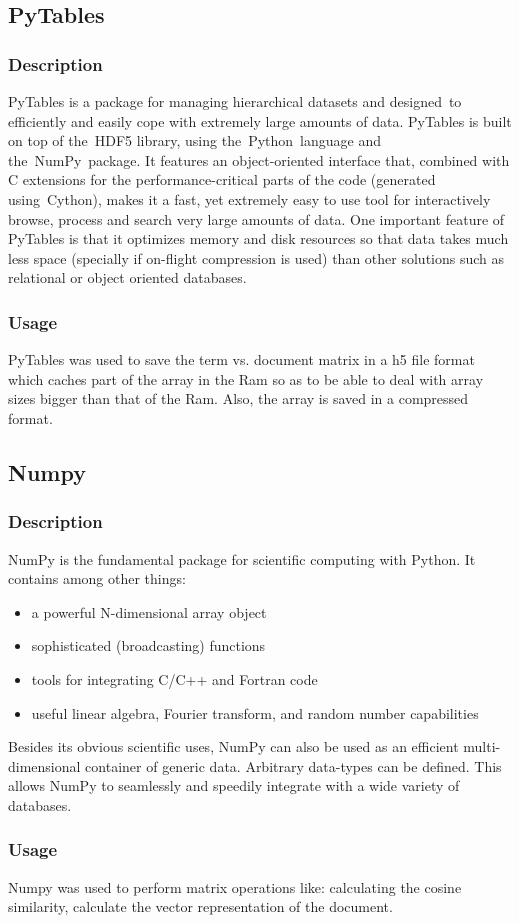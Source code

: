 \subsection{PyTables}
\subsubsection{Description}
PyTables is a package for managing hierarchical datasets and designed to efficiently and easily cope with extremely large amounts of data. 
PyTables is built on top of the HDF5 library, using the Python language and the NumPy package. It features an object-oriented interface that, combined with C extensions for the performance-critical parts of the code (generated using Cython), makes it a fast, yet extremely easy to use tool for interactively browse, process and search very large amounts of data. One important feature of PyTables is that it optimizes memory and disk resources so that data takes much less space (specially if on-flight compression is used) than other solutions such as relational or object oriented databases.
\subsubsection{Usage}
PyTables was used to save the term vs. document matrix in a h5 file format which caches part of the array in the Ram so as to be able to deal with array sizes bigger than that of the Ram. Also, the array is saved in a compressed format.
\subsection{Numpy}
\subsubsection{Description}
NumPy is the fundamental package for scientific computing with Python. It contains among other things:
\begin{itemize}
\item a powerful N-dimensional array object
\item sophisticated (broadcasting) functions
\item tools for integrating C/C++ and Fortran code
\item useful linear algebra, Fourier transform, and random number capabilities
\end{itemize}
Besides its obvious scientific uses, NumPy can also be used as an efficient multi-dimensional container of generic data. Arbitrary data-types can be defined. This allows NumPy to seamlessly and speedily integrate with a wide variety of databases.
\subsubsection{Usage}
Numpy was used to perform matrix operations like: calculating the cosine similarity, calculate the vector representation of the document.



